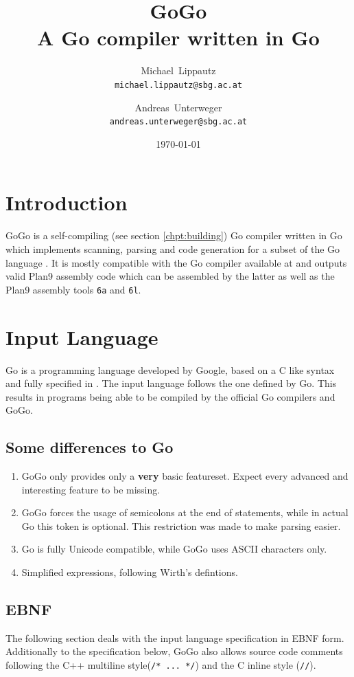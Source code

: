\documentclass[a4paper]{scrartcl}
\title{GoGo\\ \large{A Go compiler written in Go}}
\author{
  Michael~Lippautz \\ \normalsize{\texttt{michael.lippautz@sbg.ac.at}} 
    \and 
  Andreas~Unterweger \\ \normalsize{\texttt{andreas.unterweger@sbg.ac.at}} 
}
\date{\today}
\let\chapter\section
\let\section\subsection
\let\subsection\subsubsection
\let\subsubsection\paragraph
\let\paragraph\subparagraph
\let\subparagraph\undefined
\begin{document}
  \maketitle
  \tableofcontents

  \chapter{Introduction}
    GoGo is a self-compiling (see section \ref{chpt:building}) Go compiler 
    written in Go which implements scanning, parsing and code generation for a 
    subset of the Go language \cite{goo10}. It is mostly compatible with the Go 
    compiler available at \cite{goo10} and outputs valid Plan9 assembly code 
    which can be assembled by the latter as well as the Plan9 assembly tools 
    \texttt{6a} and \texttt{6l}\cite{pik00}.\\


  \chapter{Input Language}
    Go is a programming language developed by Google, based on a C like syntax and fully specified in \cite{goo10}. The input language follows the one defined by Go. This results in programs being able to be compiled by the official Go compilers and GoGo.

    \section{Some differences to Go}
      \begin{enumerate}
        \item GoGo only provides only a \textbf{very} basic featureset. Expect 
          every advanced and interesting feature to be missing.
        \item GoGo forces the usage of semicolons at the end of statements, 
          while in actual Go this token is optional. This restriction was made 
          to make parsing easier.
        \item Go is fully Unicode compatible, while GoGo uses ASCII characters only.
        \item Simplified expressions, following Wirth's defintions\cite{wir96}.
      \end{enumerate}

    \section{EBNF}
    \label{sec:ebnf}
      The following section deals with the input language specification in 
      EBNF form. Additionally to the specification below, GoGo also allows 
      source code comments following the C++ multiline style(\texttt{/* ... */}) 
      and the C inline style (\texttt{//}).
\end{document}

